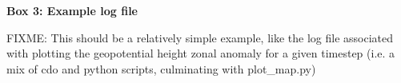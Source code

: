 \textbf{Box 3: Example log file}

FIXME: This should be a relatively simple example, like the log file associated with plotting the geopotential height zonal anomaly for a given timestep (i.e. a mix of cdo and python scripts, culminating with plot_map.py)